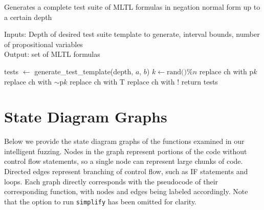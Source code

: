 \documentclass[runningheads]{llncs}
\begin{document}
\begin{algorithm}[H]
    \caption{Generates a complete test suite of MLTL formulas in negation normal form up to a certain depth}
    Inputs: Depth of desired test suite template to generate, interval bounds, number of propositional variables\\
    Output: set of MLTL formulas
    \begin{algorithmic}
        \State tests $\leftarrow$ generate\_test\_template(depth, $a$, $b$) 
                    \State $k \leftarrow \text{rand()} \% n$ 
                     replace ch with p$k$
                    \Else \hspace{1mm}replace ch with $\scriptstyle{\sim}$p$k$
                    \EndIf
                     replace ch with T
                    \Else \hspace{1mm}replace ch with $!$
                    \EndIf
                \EndIf
            \EndFor
        \EndFor
    \State return tests
    \EndProcedure
    \end{algorithmic}
\end{algorithm}
\section{State Diagram Graphs} \label{graphs appendix}
Below we provide the state diagram graphs of the functions examined in our intelligent fuzzing. Nodes in the graph represent portions of the code without control flow statements, so a single node can represent large chunks of code. Directed edges represent branching of control flow, such as IF statements and loops. Each graph directly corresponds with the pseudocode of their corresponding function, with nodes and edges being labeled accordingly. Note that the option to run \texttt{simplify} has been omitted for clarity.\\
\end{document}
